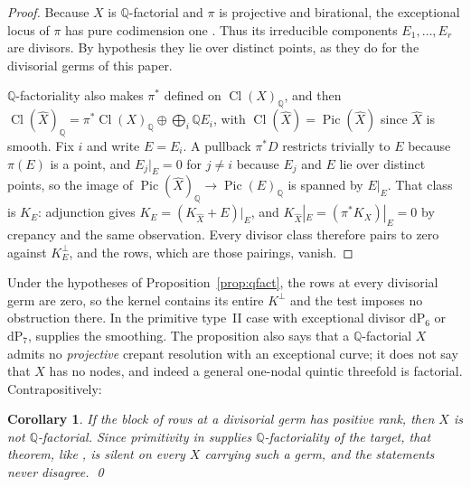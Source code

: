 \documentclass[11pt]{amsart}
\newtheorem{corollary}[theorem]{Corollary}
\theoremstyle{definition}
\theoremstyle{remark}
\theoremstyle{plain}
\newcommand{\QQ}{\mathbb{Q}}
\newcommand{\Pic}{\operatorname{Pic}}
\newcommand{\Cl}{\operatorname{Cl}}
\newcommand{\dP}{\mathrm{dP}}
\newcommand{\Xh}{\widehat{X}}
\begin{document}
\begin{proof}
Because $X$ is $\QQ$-factorial and $\pi$ is projective and birational, the
exceptional locus of $\pi$ has pure codimension one
\cite[Cor.~2.63]{KollarMori}.  Thus its irreducible components
$E_1,\dots,E_r$ are divisors.  By hypothesis they lie over distinct points,
as they do for the divisorial germs of this paper.

$\QQ$-factoriality also makes $\pi^{*}$ defined on $\Cl(X)_{\QQ}$, and
then $\Cl(\Xh)_{\QQ}=\pi^{*}\Cl(X)_{\QQ}\oplus\bigoplus_i\QQ E_i$, with
$\Cl(\Xh)=\Pic(\Xh)$ since $\Xh$ is smooth.  Fix $i$ and write $E=E_i$.
A pullback $\pi^{*}D$ restricts trivially to $E$ because $\pi(E)$ is a
point, and $E_j|_E=0$ for $j\neq i$ because $E_j$ and $E$ lie over
distinct points, so the image of $\Pic(\Xh)_\QQ\to\Pic(E)_{\QQ}$ is
spanned by $E|_E$.  That class is $K_E$: adjunction gives
$K_E=(K_{\Xh}+E)|_E$, and $K_{\Xh}|_E=(\pi^{*}K_X)|_E=0$ by crepancy and
the same observation.  Every divisor class therefore pairs to zero
against $K_E^{\perp}$, and the rows, which are those pairings, vanish.
\end{proof}

Under the hypotheses of Proposition~\ref{prop:qfact}, the rows at every
divisorial germ are zero, so the kernel contains its entire
$K^{\perp}$ and the test imposes no obstruction there.  In the primitive
type~II case with exceptional divisor $\dP_6$ or $\dP_7$,
\cite[Theorem~5.8]{Gross97} supplies the smoothing.
The proposition also
says that a $\QQ$-factorial $X$ admits no \emph{projective} crepant
resolution with an exceptional curve; it does not say that $X$ has no
nodes, and indeed a general one-nodal quintic threefold is factorial.
Contrapositively:

\begin{corollary}\label{cor:defect}
If the block of rows at a divisorial germ has positive rank, then $X$ is not
$\QQ$-factorial.  Since primitivity in \cite[Theorem~5.8]{Gross97}
supplies $\QQ$-factoriality of the target, that theorem, like
\cite[Corollary~6]{Namikawa97}, is silent on
every $X$ carrying such a germ, and the statements never
disagree. \qed
\end{corollary}
\end{document}
